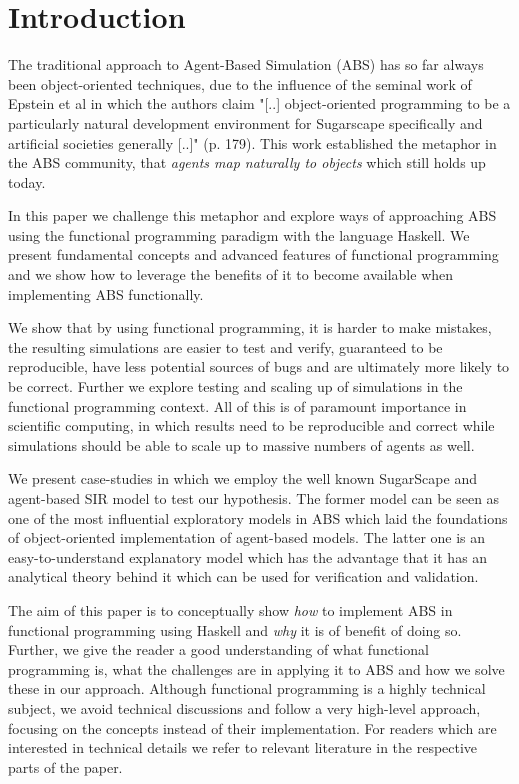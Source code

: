 \section{Introduction}
The traditional approach to Agent-Based Simulation (ABS) has so far always been object-oriented techniques, due to the influence of the seminal work of Epstein et al \cite{epstein_growing_1996} in which the authors claim "[..] object-oriented programming to be a particularly natural development environment for Sugarscape specifically and artificial societies generally [..]" (p. 179). This work established the metaphor in the ABS community, that \textit{agents map naturally to objects} \citep{north_managing_2007} which still holds up today.

In this paper we challenge this metaphor and explore ways of approaching ABS using the functional programming paradigm with the language Haskell. We present fundamental concepts and advanced features of functional programming and we show how to leverage the benefits of it \citep{hudak_history_2007} to become available when implementing ABS functionally.

We show that by using functional programming, it is harder to make mistakes, the resulting simulations are easier to test and verify, guaranteed to be reproducible, have less potential sources of bugs and are ultimately more likely to be correct. Further we explore testing and scaling up of simulations in the functional programming context. All of this is of paramount importance in scientific computing, in which results need to be reproducible and correct while simulations should be able to scale up to massive numbers of agents as well. 

We present case-studies in which we employ the well known SugarScape \citep{epstein_growing_1996} and agent-based SIR \citep{macal_agent-based_2010} model to test our hypothesis. The former model can be seen as one of the most influential exploratory models in ABS which laid the foundations of object-oriented implementation of agent-based models. The latter one is an easy-to-understand explanatory model which has the advantage that it has an analytical theory behind it which can be used for verification and validation.

The aim of this paper is to conceptually show \textit{how} to implement ABS in functional programming using Haskell and \textit{why} it is of benefit of doing so. Further, we give the reader a good understanding of what functional programming is, what the challenges are in applying it to ABS and how we solve these in our approach. Although functional programming is a highly technical subject, we avoid technical discussions and follow a very high-level approach, focusing on the concepts instead of their implementation. For readers which are interested in technical details we refer to relevant literature in the respective parts of the paper.

